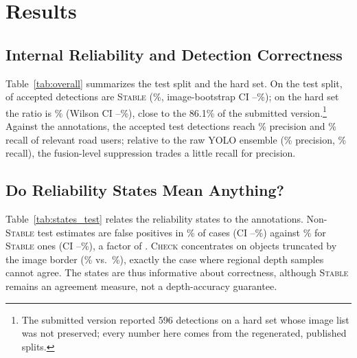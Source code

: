 \documentclass[conference,a4paper]{IEEEtran}
\newcommand{\st}[1]{\textsc{#1}}
\begin{document}
\section{Results}


\subsection{Internal Reliability and Detection Correctness}
Table~\ref{tab:overall} summarizes the test split and the hard set. On the test split, \TestStable{} of \TestAccepted{} accepted detections are \st{Stable} (\TestStablePct\%, image-bootstrap CI \TestStableBootLow--\TestStableBootHigh\%); on the hard set the ratio is \HardStablePct\% (Wilson CI \HardStableLow--\HardStableHigh\%), close to the 86.1\% of the submitted version.\footnote{The submitted version reported 596 detections on a hard set whose image list was not preserved; every number here comes from the regenerated, published splits.} Against the annotations, the accepted test detections reach \TestPrec\% precision and \TestRecRel\% recall of relevant road users; relative to the raw YOLO ensemble (\TestRawPrec\% precision, \TestRawRecRel\% recall), the fusion-level suppression trades a little recall for precision.



\subsection{Do Reliability States Mean Anything?}
Table~\ref{tab:states_test} relates the reliability states to the annotations. Non-\st{Stable} test estimates are false positives in \TestFPNonStable\% of cases (CI \TestFPNonStableLow--\TestFPNonStableHigh\%) against \TestFPStable\% for \st{Stable} ones (CI \TestFPStableLow--\TestFPStableHigh\%), a factor of \TestFPRatio. \st{Check} concentrates on objects truncated by the image border (\TestTruncCheck\% vs.\ \TestTruncStable\%), exactly the case where regional depth samples cannot agree. The states are thus informative about correctness, although \st{Stable} remains an agreement measure, not a depth-accuracy guarantee.
\end{document}
